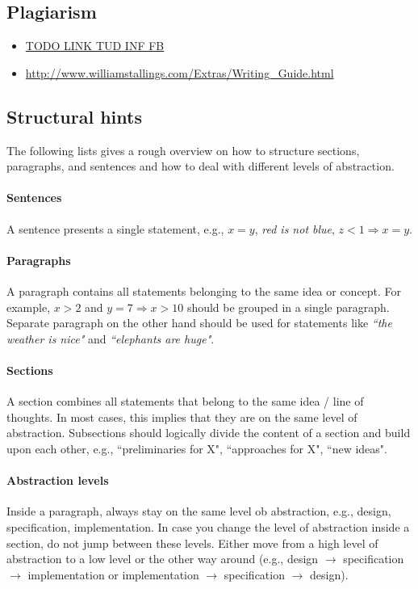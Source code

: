\documentclass{article}
\begin{document}
\subsection*{Plagiarism}

\begin{itemize}
	\item \url{TODO LINK TUD INF FB}
	\item \url{http://www.williamstallings.com/Extras/Writing_Guide.html}
\end{itemize}


\subsection*{Structural hints}

The following lists gives a rough overview on how to structure sections, paragraphs, and sentences and how to deal with different levels of abstraction.

\paragraph{Sentences}
A sentence presents a single statement, e.g., $x = y$, \emph{red is not blue}, $z < 1 \Rightarrow x = y$.

\paragraph{Paragraphs}
A paragraph contains all statements belonging to the same idea or concept.
For example, $x > 2$ and $y = 7 \Rightarrow x > 10$ should be grouped in a single paragraph.
Separate paragraph on the other hand should be used for statements like \emph{``the weather is nice"} and \emph{``elephants are huge"}.

\paragraph{Sections}
A section combines all statements that belong to the same idea / line of thoughts.
In most cases, this implies that they are on the same level of abstraction.
Subsections should logically divide the content of a section and build upon each other, e.g., ``preliminaries for X", ``approaches for X", ``new ideas".

\paragraph{Abstraction levels}
Inside a paragraph, always stay on the same level ob abstraction, e.g., design, specification, implementation.
In case you change the level of abstraction inside a section, do not jump between these levels.
Either move from a high level of abstraction to a low level or the other way around (e.g., design $\rightarrow$ specification $\rightarrow$ implementation or implementation $\rightarrow$ specification $\rightarrow$ design).
\end{document}
